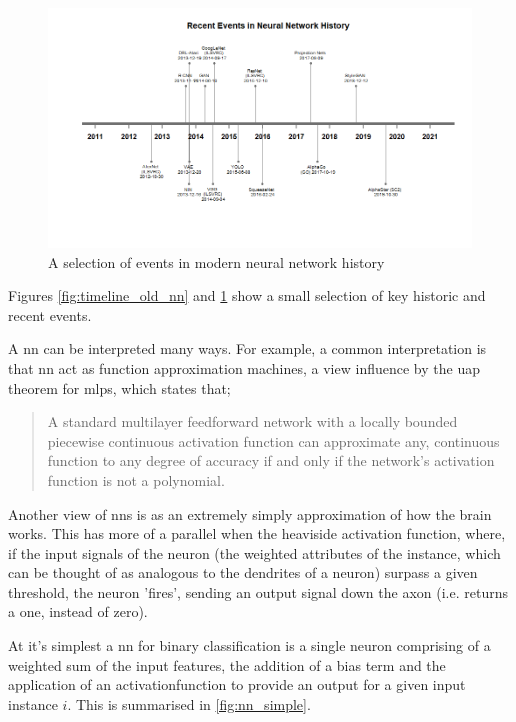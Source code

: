 \begin{figure}
    \centering
    \includegraphics[width=140mm,scale=1.5]{figs/timeline_new_nn.png}
    \caption{A selection of events in modern neural network history}
    \label{fig:timeline_new_nn}
\end{figure}

Figures \ref{fig:timeline_old_nn} and \ref{fig:timeline_new_nn} show a small selection of key historic and recent events. 

A \gls{nn} can be interpreted many ways. For example, a common interpretation is that \gls{nn} act as function approximation machines, a view influence by the \gls{uap} theorem for \gls{mlp}s, which states that;

\begin{quote}
    A standard multilayer feedforward network with a locally bounded piecewise continuous activation function can approximate any, continuous function to any degree of accuracy if and only if the network's activation function is not a polynomial.\cite{uap_mlp}
\end{quote}

Another view of \gls{nn}s is as an extremely simply approximation of how the brain works. This has more of a parallel when the heaviside activation function, where, if the input signals of the neuron (the weighted attributes of the \gls{instance}, which can be thought of as analogous to the dendrites of a neuron) surpass a given threshold, the neuron 'fires', sending an output signal down the axon (i.e. returns a one, instead of zero).
\bigskip

At it's simplest a \gls{nn} for binary classification is a single \gls{neuron} comprising of a weighted sum of the input features, the addition of a bias term and the application of an \gls{activationfunction} to provide an output for a given input \gls{instance} $i$. This is summarised in \ref{fig:nn_simple}. 

